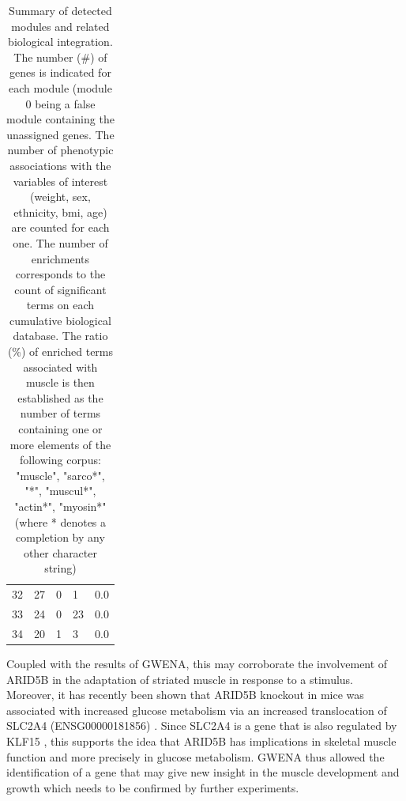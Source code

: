 \begin{table}[H]
\begin{tabular}{lllll}
32              & 27                & 0                        & 1                      & 0.0                        \\
33              & 24                & 0                        & 23                     & 0.0                        \\
34              & 20                & 1                        & 3                      & 0.0                       
\end{tabular}
\caption{Summary of detected modules and related biological integration. The number (\#) of genes is indicated for each module (module 0 being a false module containing the unassigned genes. The number of phenotypic associations with the variables of interest (weight, sex, ethnicity, bmi, age) are counted for each one. The number of enrichments corresponds to the count of significant terms on each cumulative biological database. The ratio (\%) of enriched terms associated with muscle is then established as the number of terms containing one or more elements of the following corpus: "muscle", "sarco*", "*", "muscul*", "actin*", "myosin*" (where * denotes a completion by any other character string)
}
\label{table:mod_young_bio_integration_summary}
\end{table}



 Coupled with the results of GWENA, this may corroborate the involvement of ARID5B in the adaptation of striated muscle in response to a stimulus. Moreover, it has recently been shown that ARID5B knockout in mice was associated with increased glucose metabolism via an increased translocation of SLC2A4 (ENSG00000181856) . Since SLC2A4 is a gene that is also regulated by KLF15 , this supports the idea that ARID5B has implications in skeletal muscle function and more precisely in glucose metabolism. GWENA thus allowed the identification of a gene that may give new insight in the muscle development and growth which needs to be confirmed by further experiments.

